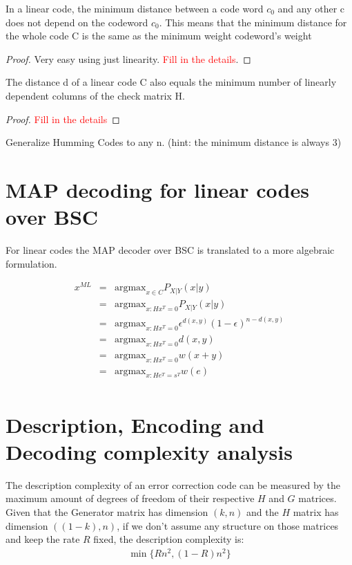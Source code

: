 \begin{theorem}
	In a linear code, the minimum distance between a code word $c_0$  and any other c does not depend on the codeword $c_0$. This means that the minimum distance for the whole code C is the same as the minimum weight codeword's weight
\end{theorem}
\begin{proof}
	Very easy using just linearity. \textcolor{red}{Fill in the details}.
\end{proof}

\begin{theorem}
The distance d of a linear code C also equals the minimum number of linearly dependent columns of the check matrix H.
\end{theorem}
\begin{proof}
	\textcolor{red}{Fill in the details}
\end{proof}

\begin{example}[Exercise]
	Generalize Humming Codes to any n. (hint: the minimum distance is always 3)
\end{example}

\section{MAP decoding for linear codes over BSC}

For linear codes the MAP decoder over BSC is translated to a more algebraic formulation.

\begin{eqnarray}
	x^{ML} &=& \text{argmax}_{x \in C} P_{X|Y}(x|y) \\
	&=& \text{argmax}_{x: Hx^T=0} P_{X|Y}(x|y) \\
	&=& \text{argmax}_{x: Hx^T=0} \epsilon^{d(x,y)}(1-\epsilon)^{n-d(x,y)} \\
	&=& \text{argmax}_{x: Hx^T=0} d(x, y) \\
	&=& \text{argmax}_{x: Hx^T=0} w(x + y) \\
	&=& \text{argmax}_{x: He^T=s^T} w(e) \\
\end{eqnarray}

\section{Description, Encoding and Decoding complexity analysis}
The description complexity of an error correction code can be measured by the maximum amount of degrees of freedom of their respective $H$ and $G$ matrices.
Given that the Generator matrix has dimension $(k, n)$ and the $H$ matrix has dimension $((1-k), n)$, if we don't assume any structure on those matrices and keep the rate $R$ fixed, the description complexity is:
\begin{eqnarray}
	\min\{Rn^2, (1-R)n^2\}
\end{eqnarray}

